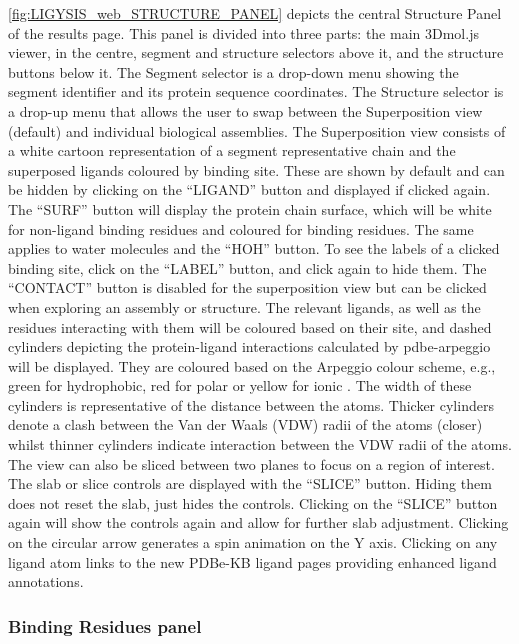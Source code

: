 \autoref{fig:LIGYSIS_web_STRUCTURE_PANEL} depicts the central Structure Panel of the results page. This panel is divided into three parts: the main 3Dmol.js viewer, in the centre, segment and structure selectors above it, and the structure buttons below it. The Segment selector  is a drop-down menu showing the segment identifier and its protein sequence coordinates. The Structure selector is a drop-up menu that allows the user to swap between the Superposition view (default) and individual biological assemblies. The Superposition view consists of a white cartoon representation of a segment representative chain and the superposed ligands coloured by binding site. These are shown by default and can be hidden by clicking on the ``LIGAND'' button and displayed if clicked again. The ``SURF'' button will display the protein chain surface, which will be white for non-ligand binding residues and coloured for binding residues. The same applies to water molecules and the ``HOH'' button. To see the labels of a clicked binding site, click on the ``LABEL'' button, and click again to hide them. The ``CONTACT'' button is disabled for the superposition view but can be clicked when exploring an assembly or structure. The relevant ligands, as well as the residues interacting with them will be coloured based on their site, and dashed cylinders depicting the protein-ligand interactions calculated by pdbe-arpeggio will be displayed. They are coloured based on the Arpeggio colour scheme, e.g., green for hydrophobic, red for polar or yellow for ionic \cite{JUBB_2017_ARPEGGIO}. The width of these cylinders is representative of the distance between the atoms. Thicker cylinders denote a clash between the Van der Waals (VDW) radii of the atoms (closer) whilst thinner cylinders indicate interaction between the VDW radii of the atoms. The view can also be sliced between two planes to focus on a region of interest. The slab or slice controls are displayed with the ``SLICE'' button. Hiding them does not reset the slab, just hides the controls. Clicking on the ``SLICE'' button again will show the controls again and allow for further slab adjustment. Clicking on the circular arrow generates a spin animation on the Y axis. Clicking on any ligand atom links to the new PDBe-KB ligand pages \cite{CHOUDHARY_2024_PDBETOOLS} providing enhanced ligand annotations.

\subsubsection{Binding Residues panel}

